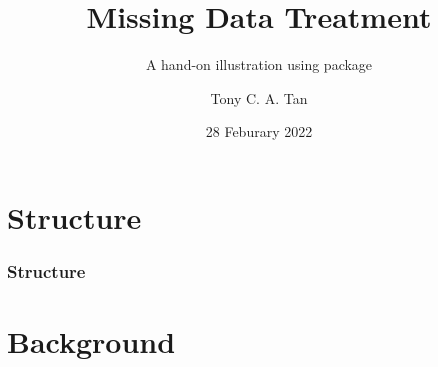 \documentclass[UKenglish
  pdftex                    %
  dvipsnames                %
]{beamer}
\author{Tony C. A. Tan}
\title{Missing Data Treatment}
\subtitle{A hand-on illustration using \cR package \pk{mice}}
\date{28 Feburary 2022}
\begin{document}
\section*{Structure}
\begin{frame}%
\frametitle{Structure}

  \tableofcontents%

\end{frame}

\section{Background}
\end{document}
